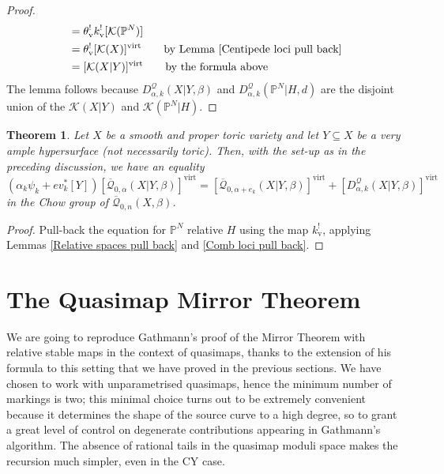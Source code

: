 \documentclass[11pt]{amsart}
\newcommand{\Q}[4]{\overline{\mathcal Q}_{#1,#2}(#3,#4)}
\newcommand{\PP}{\mathbb P}
\newcommand{\virt}[1]{[#1]^{\operatorname{virt}}}
\theoremstyle{plain}
\newtheorem{thm}{Theorem}[section]
\theoremstyle{definition}
\begin{document}
\begin{proof}
\begin{align*}
& = \theta_{\text{v}}^! k_{\text{v}}^! [ \mathcal{K}(\PP^N) ] \\
& = \theta_{\text{v}}^! \virt{\mathcal{K}(X)} \text{\qquad by Lemma \ref{Centipede loci pull back}} \\
& = \virt{\mathcal{K}(X|Y)} \text{\qquad by the formula above}
\end{align*}
The lemma follows because $D^\mathcal{Q}_{\alpha,k}(X|Y,\beta)$ and $D^\mathcal{Q}_{\alpha,k}(\PP^N|H,d)$ are the disjoint union of the $\mathcal{K}(X|Y)$ and $\mathcal{K}(\PP^N|H)$. \end{proof}

\begin{thm} Let $X$ be a smooth and proper toric variety and let $Y \subseteq X$ be a very ample hypersurface (not necessarily toric). Then, with the set-up as in the preceding discussion, we have an equality
\begin{equation*} (\alpha_k \psi_k + ev_k^* [Y]) \virt{\Q{0}{\alpha}{X|Y}{\beta}} = \virt{\Q{0}{\alpha+e_k}{X|Y}{\beta}} + \virt{D^\mathcal{Q}_{\alpha,k}(X|Y,\beta)} \end{equation*}
in the Chow group of $\Q{0}{n}{X}{\beta}$. \end{thm}
\begin{proof} Pull-back the equation for $\PP^N$ relative $H$ using the map $k_{\text{v}}^!$, applying Lemmas \ref{Relative spaces pull back} and \ref{Comb loci pull back}. \end{proof}

\section{The Quasimap Mirror Theorem}

We are going to reproduce Gathmann's proof of the Mirror Theorem with relative stable maps \cite{Ga-MF} in the context of quasimaps, thanks to the extension of his formula to this setting that we have proved in the previous sections. We have chosen to work with unparametrised quasimaps, hence the minimum number of markings is two; this minimal choice turns out to be extremely convenient because it determines the shape of the source curve to a high degree, so to grant a great level of control on degenerate contributions appearing in Gathmann's algorithm. The absence of rational tails in the quasimap moduli space makes the recursion much simpler, even in the CY case.
\end{document}

